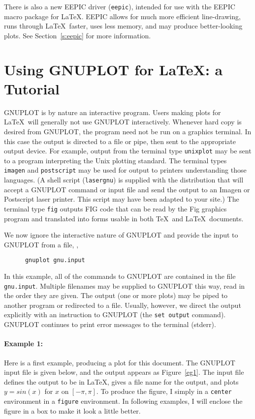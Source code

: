 There is also a new EEPIC driver ({\tt eepic}), intended for use with
the EEPIC macro package for \LaTeX. EEPIC allows for much more
efficient line-drawing, runs through \LaTeX\ faster, uses less memory,
and may produce better-looking plots. See Section~\ref{s:eepic} for
more information.

\section{Using GNUPLOT for \LaTeX: a Tutorial}

GNUPLOT is by nature an interactive program. Users making plots for
\LaTeX\ will generally not use GNUPLOT interactively.  Whenever hard
copy is desired from GNUPLOT, the program need not be run on a
graphics terminal. In this case the output is directed to a file or
pipe, then sent to the appropriate output device. For example, output
from the terminal type {\tt unixplot} may be sent to a program
interpreting the Unix plotting standard. The terminal types {\tt
imagen} and {\tt postscript} may be used for output to printers
understanding those languages. (A shell script ({\tt lasergnu}) is
supplied with the distribution that will accept a GNUPLOT command or
input file and send the output to an Imagen or Postscript laser
printer. This script may have been adapted to your site.) The terminal
type {\tt fig} outputs FIG code that can be read by the Fig graphics
program and translated into forms usable in both \TeX\ and
\LaTeX\ documents.

We now ignore the interactive nature of GNUPLOT and provide the input
to GNUPLOT from a file, \ie,
\begin{verbatim}
      gnuplot gnu.input
\end{verbatim}
In this example, all of the commands to GNUPLOT are contained in the
file {\tt gnu.input}. Multiple filenames may be supplied to GNUPLOT
this way, read in the order they are given.  The output (one or more
plots) may be piped to another program or redirected to a file.
Usually, however, we direct the output explicitly with an instruction
to GNUPLOT (the {\tt set output} command). GNUPLOT continues to print
error messages to the terminal (stderr).

\paragraph{Example 1:} Here is a first example, producing a plot for
this document. The GNUPLOT input file is given below, and the output
appears as Figure~\ref{eg1}. The input file defines the output to be
in \LaTeX, gives a file name for the output, and plots $y=sin(x)$ for
$x$ on $[-\pi,\pi]$. To produce the figure, I simply
\verb++ in a {\tt center} environment in a {\tt figure}
environment. In following examples, I will enclose the figure in a box
to make it look a little better.

